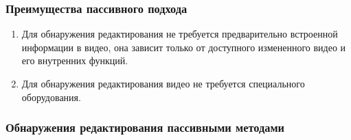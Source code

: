 \documentclass[12pt]{article}
\begin{document}
    \subsubsection{Преимущества пассивного подхода}
        \newline
        \begin{enumerate}
            \item Для обнаружения редактирования не требуется предварительно встроенной информации в видео, она зависит только от доступного измененного видео и его внутренних функций.
            \item Для обнаружения редактирования видео не требуется специального оборудования.
        \end{enumerate}
    \subsubsection{Обнаружения редактирования пассивными методами}
\end{document}
